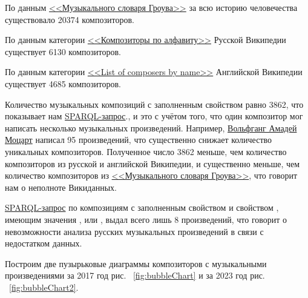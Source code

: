 По данным \href{https://ru.wikipedia.org/wiki/Музыкальный_словарь_Гроува}{<<Музыкального словаря Гроува>>} за всю историю человечества существовало \num{20374} композиторов.


По данным категории \href{https://ru.wikipedia.org/wiki/Категория:Композиторы_по_алфавиту}{<<Композиторы по алфавиту>>} Русской Википедии существует \num{6130} композиторов.


По данным категории \href{https://en.wikipedia.org/wiki/List_of_composers_by_name}{<<List of composers by name>>} Английской Википедии существует \num{4685} композиторов.


Количество музыкальных композиций с заполненным свойством  равно \num{3862}, {что показывает нам \href{https://w.wiki/56Rc}{SPARQL-запрос}.}, и это с учётом того, что один композитор мог написать несколько музыкальных произведений. Например, \href{https://ru.wikipedia.org/wiki/Моцарт,_Вольфганг_Амадей}{Вольфганг Амадей Моцарт} написал \num{95} произведений, что существенно снижает количество уникальных композиторов. Полученное число \num{3862} меньше, чем количество композиторов из русской и английской Википедии, и существенно меньше, чем количество композиторов из \href{https://ru.wikipedia.org/wiki/Музыкальный_словарь_Гроува}{<<Музыкального словаря Гроува>>}, что говорит нам о неполноте Викиданных.

\href{https://w.wiki/56Rj}{SPARQL-запрос} по композициям с заполненным свойством  и свойством , имеющим значения ,  или , выдал всего лишь \num{8} произведений, что говорит о невозможности анализа русских музыкальных произведений в связи с недостатком данных.

Построим  две пузырьковые диаграммы композиторов с музыкальными произведениями за 2017 год рис. ~\ref{fig:bubbleChart} и за 2023 год рис. ~\ref{fig:bubbleChart2}.

